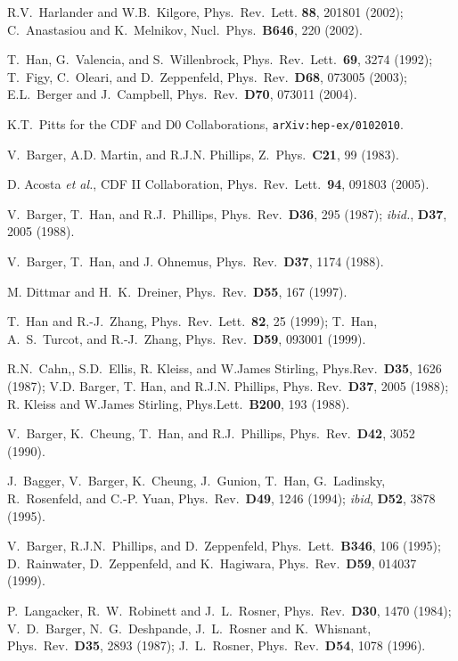 \documentclass[prd,aps,floats,preprintnumbers,preprint,superscriptaddress,floatfix,nofootinbib]{revtex4}
\begin{document}
\begin{thebibliography}{99}
R.V.~Harlander and W.B.~Kilgore,  Phys.~Rev.~Lett. {\bf 88}, 201801 (2002);
 C.~Anastasiou and K.~Melnikov, Nucl.~Phys.~{\bf B646}, 220 (2002).

 T.~Han, G.~Valencia, and S.~Willenbrock,
Phys.~Rev.~Lett.~{\bf 69}, 3274 (1992);  
T.~Figy, C.~Oleari, and D.~Zeppenfeld,  Phys.~Rev.~{\bf D68}, 073005 (2003);  
E.L.~Berger and  J.~Campbell,  Phys.~Rev.~{\bf D70}, 073011 (2004).

 K.T.~Pitts for the CDF and D0 Collaborations, 
{\tt arXiv:hep-ex/0102010}.

 V.~Barger, A.D. Martin, and R.J.N. Phillips, Z.~Phys.~{\bf C21}, 99 (1983).
 
  D. Acosta {\it et al.}, CDF II Collaboration, 
Phys.~Rev.~Lett.~{\bf 94}, 091803 (2005).

 V.~Barger, T.~Han, and R.J.~Phillips, 
Phys.~Rev.~{\bf D36}, 295 (1987); {\it ibid.}, {\bf D37}, 2005 (1988).

 V.~Barger, T.~Han, and J. Ohnemus,  Phys.~Rev.~{\bf D37}, 1174 (1988).

M. Dittmar and H.~K.~Dreiner, Phys.~Rev.~{\bf D55}, 167 (1997).
 
   T.~Han and R.-J.~Zhang, Phys.~Rev.~Lett.~{\bf 82}, 25 (1999); 
   T.~Han, A.~S.~Turcot, and R.-J.~Zhang, Phys.~Rev.~{\bf D59}, 093001 (1999).

 R.N.~Cahn,, S.D.~Ellis, R. Kleiss, and W.James Stirling,
 Phys.Rev.~{\bf D35}, 1626 (1987); 
  V.D. Barger, T. Han, and R.J.N. Phillips,
  Phys. Rev.~{\bf D37}, 2005 (1988);
   R. Kleiss and  W.James Stirling, Phys.Lett.~{\bf B200}, 193 (1988).

 V.~Barger, K.~Cheung, T.~Han, and R.J.~Phillips, 
Phys.~Rev.~{\bf D42}, 3052 (1990).

 J.~Bagger, V.~Barger, K.~Cheung, J.~Gunion, 
T.~Han, G.~Ladinsky, R.~Rosenfeld, and C.-P. Yuan,
Phys.~Rev.~{\bf D49}, 1246 (1994); {\it ibid}, {\bf D52}, 3878 (1995).

V.~Barger, R.J.N.~Phillips, and D.~Zeppenfeld,
Phys.~Lett.~{\bf B346}, 106 (1995); 
D.~Rainwater, D.~Zeppenfeld, and K.~Hagiwara,
Phys.~Rev.~{\bf D59}, 014037 (1999).

P.~Langacker, R.~W.~Robinett and J.~L.~Rosner,
Phys.\ Rev.\ {\bf D30}, 1470 (1984);
V.~D.~Barger, N.~G.~Deshpande, J.~L.~Rosner and K.~Whisnant,
Phys.\ Rev.\ {\bf D35}, 2893 (1987);
J.~L.~Rosner,
Phys.\ Rev.\ {\bf D54}, 1078 (1996).


\end{thebibliography}
\end{document}
